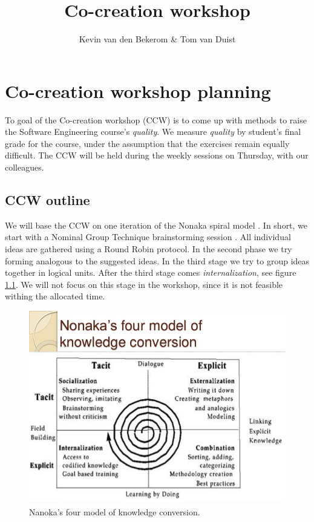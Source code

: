 

\title{Co-creation workshop}
\newcommand{\TitelAbbr}{}
\newcommand{\Version}{0.1}



\what{}
\supervisors{}
\author{Kevin van den Bekerom \& Tom van Duist}




\maketitle

\clearpage


\chapter{Co-creation workshop planning}
To goal of the Co-creation workshop (CCW) is to come up with methods to raise the Software Engineering course's \textit{quality}.
We measure \textit{quality} by student's final grade for the course, under the assumption that the exercises remain equally difficult. The CCW will be held during the weekly sessions on Thursday, with our colleagues. \\

\section{CCW outline}
We will base the CCW on one iteration of the Nonaka spiral model \cite{nonaka}. In short, we start with a Nominal Group Technique brainstorming session \cite{NGT}. All individual ideas are gathered using a Round Robin protocol. In the second phase we try forming analogous to the suggested ideas. In the third stage we try to group ideas together in logical units. After the third stage comes \textit{internalization}, see figure \ref{fig:spiral}. We will not focus on this stage in the workshop, since it is not feasible withing the allocated time.

\begin{figure}[h]
	\centering
	\includegraphics[width=0.75\linewidth]{spiral.jpg}
	\caption{Nanoka's four model of knowledge conversion.}
	\label{fig:spiral}
\end{figure}  

